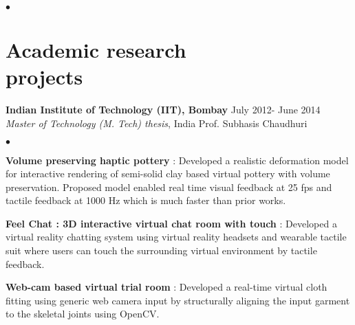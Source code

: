 \documentclass[margin,line]{res}
\newenvironment{list2}{
  \begin{list}{$\bullet$}{%
      \setlength{\itemsep}{0in}
      \setlength{\parsep}{0in} \setlength{\parskip}{0in}
      \setlength{\topsep}{0in} \setlength{\partopsep}{0in} 
      \setlength{\leftmargin}{0.2in}}}{\end{list}}
\begin{document}
\begin{resume}
\begin{list2}
  \end{list2}


\section{\sc Academic research \\ projects} 

{\bf Indian Institute of Technology (IIT), Bombay}  \hfill July 2012- June 2014 \\
\textit{Master of Technology (M. Tech) thesis}, India \hfill Prof. Subhasis Chaudhuri\\

  \begin{list2}

  	\item \textbf{Volume preserving haptic pottery} : %
  	Developed a realistic deformation model for interactive rendering of semi-solid clay based virtual pottery with volume preservation. Proposed model enabled real time visual feedback at 25 fps and tactile feedback at 1000 Hz which is much faster than prior works.\\
  	

  	\item \textbf{Feel Chat : 3D interactive virtual chat room with touch} : %
  	Developed a virtual reality chatting system using virtual reality headsets and wearable tactile suit where users can touch the surrounding virtual environment by tactile feedback.  \\
  	

  	\item \textbf{Web-cam based virtual trial room} : %
  	Developed a real-time virtual cloth fitting using generic web camera input by structurally aligning the input garment to the skeletal joints using OpenCV.\\
  

\end{list2}
\end{resume}
\end{document}
